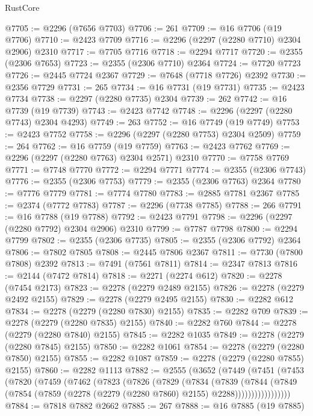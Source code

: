 \begin{lexlean}{RustCore}
\begin{coremodule}
@7705 := @2296 (@7656 @7703)
@7706 := 261
@7709 := @16 @7706 (@19 @7706)
@7710 := @2423 @7709
@7716 := @2296 (@2297 (@2280 @7710) @2304 @2906) @2310
@7717 := @7705 @7716
@7718 := @2294 @7717
@7720 := @2355 (@2306 @7653)
@7723 := @2355 (@2306 @7710) @2364
@7724 := @7720 @7723
@7726 := @2445 @7724 @2367
@7729 := @7648 (@7718 @7726) @2392
@7730 := @2356 @7729
@7731 := 265
@7734 := @16 @7731 (@19 @7731)
@7735 := @2423 @7734
@7738 := @2297 (@2280 @7735) @2304
@7739 := 262
@7742 := @16 @7739 (@19 @7739)
@7743 := @2423 @7742
@7748 := @2296 (@2297 (@2280 @7743) @2304 @4293)
@7749 := 263
@7752 := @16 @7749 (@19 @7749)
@7753 := @2423 @7752
@7758 := @2296 (@2297 (@2280 @7753) @2304 @2509)
@7759 := 264
@7762 := @16 @7759 (@19 @7759)
@7763 := @2423 @7762
@7769 := @2296 (@2297 (@2280 @7763) @2304 @2571) @2310
@7770 := @7758 @7769
@7771 := @7748 @7770
@7772 := @2294 @7771
@7774 := @2355 (@2306 @7743)
@7776 := @2355 (@2306 @7753)
@7779 := @2355 (@2306 @7763) @2364
@7780 := @7776 @7779
@7781 := @7774 @7780
@7783 := @2885 @7781 @2367
@7785 := @2374 (@7772 @7783)
@7787 := @2296 (@7738 @7785)
@7788 := 266
@7791 := @16 @7788 (@19 @7788)
@7792 := @2423 @7791
@7798 := @2296 (@2297 (@2280 @7792) @2304 @2906) @2310
@7799 := @7787 @7798
@7800 := @2294 @7799
@7802 := @2355 (@2306 @7735)
@7805 := @2355 (@2306 @7792) @2364
@7806 := @7802 @7805
@7808 := @2445 @7806 @2367
@7811 := @7730 (@7800 @7808) @2392
@7813 := @7491 (@7561 @7811)
@7814 := @2347 @7813
@7816 := @2144 (@7472 @7814)
@7818 := @2271 (@2274 @612)
@7820 := @2278 (@7454 @2173)
@7823 := @2278 (@2279 @2489 @2155)
@7826 := @2278 (@2279 @2492 @2155)
@7829 := @2278 (@2279 @2495 @2155)
@7830 := @2282 @612
@7834 := @2278 (@2279 (@2280 @7830) @2155)
@7835 := @2282 @709
@7839 := @2278 (@2279 (@2280 @7835) @2155)
@7840 := @2282 @760
@7844 := @2278 (@2279 (@2280 @7840) @2155)
@7845 := @2282 @1035
@7849 := @2278 (@2279 (@2280 @7845) @2155)
@7850 := @2282 @1061
@7854 := @2278 (@2279 (@2280 @7850) @2155)
@7855 := @2282 @1087
@7859 := @2278 (@2279 (@2280 @7855) @2155)
@7860 := @2282 @1113
@7882 := @2555
    (@3652
      (@7449
        (@7451
          (@7453
            (@7820
              (@7459
                (@7462
                  (@7823
                    (@7826
                      (@7829
                        (@7834
                          (@7839
                            (@7844
                              (@7849
                                (@7854
                                  (@7859 (@2278 (@2279 (@2280 @7860) @2155) @2288)))))))))))))))))
@7884 := @7818 @7882 @2662
@7885 := 267
@7888 := @16 @7885 (@19 @7885)

\end{coremodule}
\end{lexlean}

